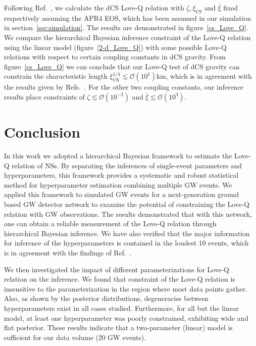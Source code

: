 \documentclass[a4paper,11pt]{article}
\begin{document}
Following Ref.~\cite{Yagi_2017}, we calculate the dCS Love-Q relation with $\zeta, \xi_{\mathrm{CS}}$ and $\bar{\xi}$ fixed respectively assuming the APR4 EOS, which has been assumed in our simulation in section~\ref{sec:simulation}. The results are demonstrated in figure~\ref{cs_Love_Q}. We compare the hierarchical Bayesian inference constraint of the Love-Q relation using the linear model (figure~\ref{2-d_Love_Q}) with some possible Love-Q relations with respect to certain coupling constants in dCS gravity. From figure~\ref{cs_Love_Q} we can conclude that our Love-Q test of dCS gravity can constrain the characteristic length $\xi_{\mathrm{CS}}^{1/4} \lesssim \mathcal{O}(10^1)$km, which is in agreement with the results given by Refs.~\cite{Yagi:2013bca,Yagi:2013awa}. For the other two coupling constants, our inference results place constraints of $\zeta \lesssim \mathcal{O}(10^{-2})$ and $\bar{\xi} \lesssim \mathcal{O}(10^{3})$.

\section{Conclusion}
\label{sec:conclusion}

In this work we adopted a hierarchical Bayesian framework to estimate the Love-Q relation of NSs. By separating the inferences of single-event parameters and hyperparameters, this framework provides a systematic and robust statistical method for hyperparameter estimation combining multiple GW events. We applied this framework to simulated GW events for a next-generation ground based GW detector network to examine the potential of constraining the Love-Q relation with GW observations. The results demonstrated that with this network, one can obtain a reliable measurement of the Love-Q relation through hierarchical Bayesian inference. We have also verified that the major information for inference of the hyperparameters is contained in the loudest 10 events, which is in agreement with the findings of Ref.~\cite{Lackey:2014fwa}.

We then investigated the impact of different parameterizations for Love-Q relation on the inference. We found that constraint of the Love-Q relation is insensitive to the parameterization in the region where most data points gather.
Also, as shown by the posterior distributions, degeneracies between hyperparameters exist in all cases studied. Furthermore, for all but the linear model, at least one hyperparameter was poorly constrained, exhibiting wide and flat posterior. These results indicate that a two-parameter (linear) model is sufficient for our data volume (20 GW events).
\end{document}
